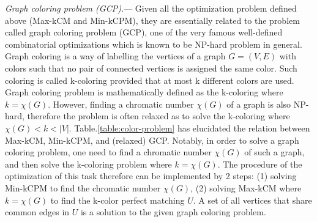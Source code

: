 \documentclass[%
 reprint,
nofootinbib,
 amsmath,amssymb,
 aps,
floatfix,
]{revtex4-2}
\begin{document}
\emph{Graph coloring problem (GCP).}--- Given all the optimization problem defined above (Max-kCM and Min-kCPM), they are essentially related to the problem called graph coloring problem (GCP), one of the very famous well-defined combinatorial optimizations which is known to be NP-hard problem in general. Graph coloring is a way of labelling the vertices of a graph $G=(V,E)$ with colors such that no pair of connected vertices is assigned the same color. Such coloring is called k-coloring provided that at most k different colors are used. Graph coloring problem is mathematically defined as the k-coloring where $k=\chi(G)$. However, finding a chromatic number $\chi(G)$ of a graph is also NP-hard, therefore the problem is often relaxed as to solve the k-coloring where $\chi(G)<k<|V|$. Table.\ref{table:color-problem} has elucidated the relation between Max-kCM, Min-kCPM, and (relaxed) GCP.  Notably, in order to solve a graph coloring problem, one need to find a chromatic number $\chi(G)$ of such a graph, and then solve the k-coloring problem where $k=\chi(G)$. The procedure of the optimization of this task therefore can be implemented by 2 steps: (1) solving Min-kCPM to find the chromatic number $\chi(G)$, (2) solving Max-kCM where $k=\chi(G)$ to find the k-color perfect matching $U$. A set of all vertices that share common edges in $U$ is a solution to the given graph coloring problem. \\
\end{document}
